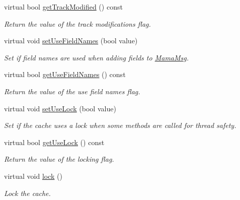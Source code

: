 \begin{DoxyCompactItemize}
virtual bool \hyperlink{classWombat_1_1MamaFieldCache_a8dbe545195a5232d3850970ec78077e5}{getTrackModified} () const 
\begin{DoxyCompactList}\small\item\em Return the value of the track modifications flag. \item\end{DoxyCompactList}\item 
virtual void \hyperlink{classWombat_1_1MamaFieldCache_a3df35f467c5a3fa970a4dd216a9ac844}{setUseFieldNames} (bool value)
\begin{DoxyCompactList}\small\item\em Set if field names are used when adding fields to \hyperlink{classWombat_1_1MamaMsg}{MamaMsg}. \item\end{DoxyCompactList}\item 
virtual bool \hyperlink{classWombat_1_1MamaFieldCache_a3a674042375a0137abdd61216185a153}{getUseFieldNames} () const 
\begin{DoxyCompactList}\small\item\em Return the value of the use field names flag. \item\end{DoxyCompactList}\item 
virtual void \hyperlink{classWombat_1_1MamaFieldCache_afded21fe9315c13424a5aeec98eca6f4}{setUseLock} (bool value)
\begin{DoxyCompactList}\small\item\em Set if the cache uses a lock when some methods are called for thread safety. \item\end{DoxyCompactList}\item 
virtual bool \hyperlink{classWombat_1_1MamaFieldCache_ae1768067014f7f185abadf860e1a251b}{getUseLock} () const 
\begin{DoxyCompactList}\small\item\em Return the value of the locking flag. \item\end{DoxyCompactList}\item 
virtual void \hyperlink{classWombat_1_1MamaFieldCache_aa6b7b3ec3994c45c88736819bc903679}{lock} ()
\begin{DoxyCompactList}\small\item\em Lock the cache. \item\end{DoxyCompactList}\item 

\end{DoxyCompactItemize}
